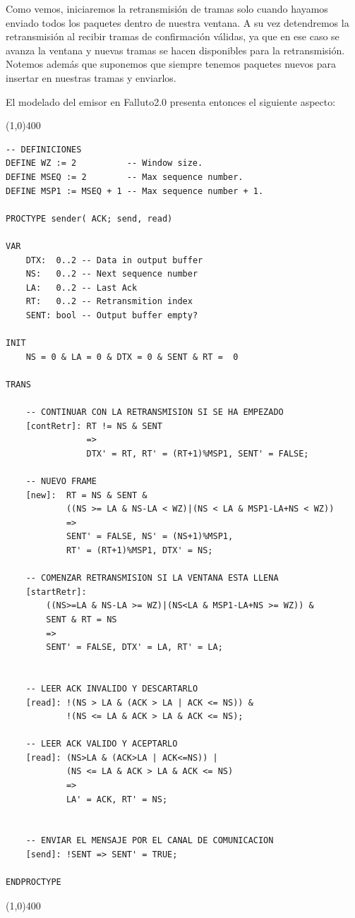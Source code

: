\documentclass[titlepage, 12pt]{book}
\begin{document}
Como vemos, iniciaremos la retransmisi\'on de tramas solo cuando hayamos enviado todos los paquetes dentro de nuestra ventana. A su vez detendremos la retransmisi\'on al recibir tramas de confirmaci\'on v\'alidas, ya que en ese caso se avanza la ventana y nuevas tramas se hacen disponibles para la retransmisi\'on. Notemos adem\'as que suponemos que siempre tenemos paquetes nuevos para insertar en nuestras tramas y enviarlos.

El modelado del emisor en Falluto2.0 presenta entonces el siguiente aspecto:

\noindent \line(1,0){400}
\begin{verbatim}
-- DEFINICIONES
DEFINE WZ := 2          -- Window size.
DEFINE MSEQ := 2        -- Max sequence number.
DEFINE MSP1 := MSEQ + 1 -- Max sequence number + 1.

PROCTYPE sender( ACK; send, read)

VAR
    DTX:  0..2 -- Data in output buffer
    NS:   0..2 -- Next sequence number
    LA:   0..2 -- Last Ack
    RT:   0..2 -- Retransmition index
    SENT: bool -- Output buffer empty?

INIT
    NS = 0 & LA = 0 & DTX = 0 & SENT & RT =  0

TRANS

    -- CONTINUAR CON LA RETRANSMISION SI SE HA EMPEZADO
    [contRetr]: RT != NS & SENT 
                => 
                DTX' = RT, RT' = (RT+1)%MSP1, SENT' = FALSE;

    -- NUEVO FRAME 
    [new]:  RT = NS & SENT & 
            ((NS >= LA & NS-LA < WZ)|(NS < LA & MSP1-LA+NS < WZ))
            => 
            SENT' = FALSE, NS' = (NS+1)%MSP1, 
            RT' = (RT+1)%MSP1, DTX' = NS;

    -- COMENZAR RETRANSMISION SI LA VENTANA ESTA LLENA
    [startRetr]: 
        ((NS>=LA & NS-LA >= WZ)|(NS<LA & MSP1-LA+NS >= WZ)) & 
        SENT & RT = NS 
        => 
        SENT' = FALSE, DTX' = LA, RT' = LA;


    -- LEER ACK INVALIDO Y DESCARTARLO
    [read]: !(NS > LA & (ACK > LA | ACK <= NS)) & 
            !(NS <= LA & ACK > LA & ACK <= NS);

    -- LEER ACK VALIDO Y ACEPTARLO
    [read]: (NS>LA & (ACK>LA | ACK<=NS)) |
            (NS <= LA & ACK > LA & ACK <= NS) 
            => 
            LA' = ACK, RT' = NS;


    -- ENVIAR EL MENSAJE POR EL CANAL DE COMUNICACION
    [send]: !SENT => SENT' = TRUE;

ENDPROCTYPE
\end{verbatim}
\noindent \line(1,0){400}\\
\end{document}
